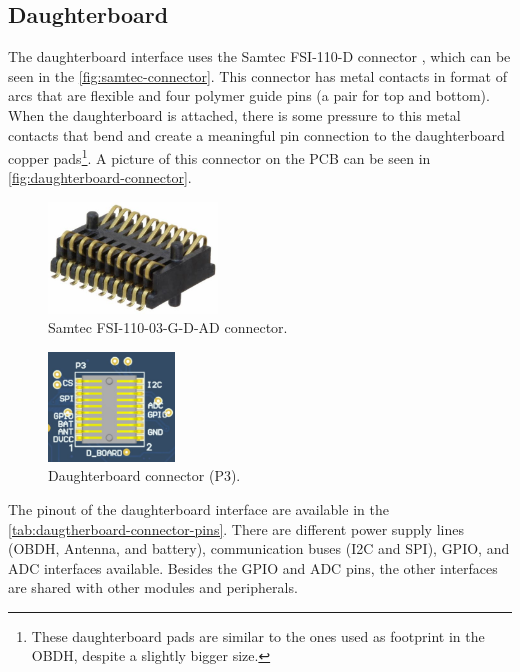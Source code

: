 \subsection{Daughterboard}

The daughterboard interface uses the Samtec FSI-110-D connector \cite{fsi-conn}, which can be seen in the \autoref{fig:samtec-connector}. This connector has metal contacts in format of arcs that are flexible and four polymer guide pins (a pair for top and bottom). When the daughterboard is attached, there is some pressure to this metal contacts that bend and create a meaningful pin connection to the daughterboard copper pads\footnote{These daughterboard pads are similar to the ones used as footprint in the OBDH, despite a slightly bigger size.}. A picture of this connector on the PCB can be seen in \autoref{fig:daughterboard-connector}.

\begin{figure}[!ht]
    \begin{center}
        \includegraphics[width=0.4\textwidth]{figures/samtec_fsi-110-03-g-d-ad.jpeg}
        \caption{Samtec FSI-110-03-G-D-AD connector.}
        \label{fig:samtec-connector}
    \end{center}
\end{figure}

\begin{figure}[!ht]
    \begin{center}
        \includegraphics[width=0.3\textwidth]{figures/p3-connector.png}
        \caption{Daughterboard connector (P3).}
        \label{fig:daughterboard-connector}
    \end{center}
\end{figure}

The pinout of the daughterboard interface are available in the \autoref{tab:daugtherboard-connector-pins}. There are different power supply lines (OBDH, Antenna, and battery), communication buses (I2C and SPI), GPIO, and ADC interfaces available. Besides the GPIO and ADC pins, the other interfaces are shared with other modules and peripherals.

